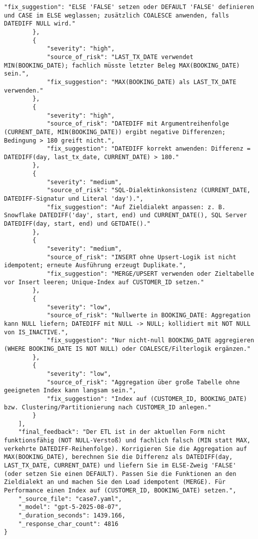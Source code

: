 \begin{lstlisting}[caption={Ausgabe: GPT-5 Anwendungsfall 7 Konsistenzdurchlauf},label={gpt_case7_prompt2}]
            "fix_suggestion": "ELSE 'FALSE' setzen oder DEFAULT 'FALSE' definieren und CASE im ELSE weglassen; zusätzlich COALESCE anwenden, falls DATEDIFF NULL wird."
        },
        {
            "severity": "high",
            "source_of_risk": "LAST_TX_DATE verwendet MIN(BOOKING_DATE); fachlich müsste letzter Beleg MAX(BOOKING_DATE) sein.",
            "fix_suggestion": "MAX(BOOKING_DATE) als LAST_TX_DATE verwenden."
        },
        {
            "severity": "high",
            "source_of_risk": "DATEDIFF mit Argumentreihenfolge (CURRENT_DATE, MIN(BOOKING_DATE)) ergibt negative Differenzen; Bedingung > 180 greift nicht.",
            "fix_suggestion": "DATEDIFF korrekt anwenden: Differenz = DATEDIFF(day, last_tx_date, CURRENT_DATE) > 180."
        },
        {
            "severity": "medium",
            "source_of_risk": "SQL-Dialektinkonsistenz (CURRENT_DATE, DATEDIFF-Signatur und Literal 'day').",
            "fix_suggestion": "Auf Zieldialekt anpassen: z. B. Snowflake DATEDIFF('day', start, end) und CURRENT_DATE(), SQL Server DATEDIFF(day, start, end) und GETDATE()."
        },
        {
            "severity": "medium",
            "source_of_risk": "INSERT ohne Upsert-Logik ist nicht idempotent; erneute Ausführung erzeugt Duplikate.",
            "fix_suggestion": "MERGE/UPSERT verwenden oder Zieltabelle vor Insert leeren; Unique-Index auf CUSTOMER_ID setzen."
        },
        {
            "severity": "low",
            "source_of_risk": "Nullwerte in BOOKING_DATE: Aggregation kann NULL liefern; DATEDIFF mit NULL -> NULL; kollidiert mit NOT NULL von IS_INACTIVE.",
            "fix_suggestion": "Nur nicht-null BOOKING_DATE aggregieren (WHERE BOOKING_DATE IS NOT NULL) oder COALESCE/Filterlogik ergänzen."
        },
        {
            "severity": "low",
            "source_of_risk": "Aggregation über große Tabelle ohne geeigneten Index kann langsam sein.",
            "fix_suggestion": "Index auf (CUSTOMER_ID, BOOKING_DATE) bzw. Clustering/Partitionierung nach CUSTOMER_ID anlegen."
        }
    ],
    "final_feedback": "Der ETL ist in der aktuellen Form nicht funktionsfähig (NOT NULL-Verstoß) und fachlich falsch (MIN statt MAX, verkehrte DATEDIFF-Reihenfolge). Korrigieren Sie die Aggregation auf MAX(BOOKING_DATE), berechnen Sie die Differenz als DATEDIFF(day, LAST_TX_DATE, CURRENT_DATE) und liefern Sie im ELSE-Zweig 'FALSE' (oder setzen Sie einen DEFAULT). Passen Sie die Funktionen an den Zieldialekt an und machen Sie den Load idempotent (MERGE). Für Performance einen Index auf (CUSTOMER_ID, BOOKING_DATE) setzen.",
    "_source_file": "case7.yaml",
    "_model": "gpt-5-2025-08-07",
    "_duration_seconds": 1439.166,
    "_response_char_count": 4816
}
\end{lstlisting}

